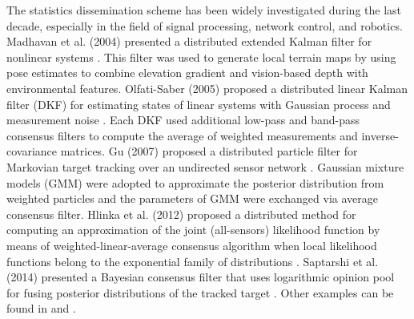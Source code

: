 	The statistics dissemination scheme has been widely investigated during the last decade, especially in the field of signal processing, network control, and robotics.
	Madhavan et al. (2004) presented a distributed extended Kalman filter for nonlinear systems \cite{madhavan2004distributed}. 
	This filter was used to generate local terrain maps by using pose estimates to combine elevation gradient and vision-based depth with environmental features. 
	Olfati-Saber (2005) proposed a distributed linear Kalman filter (DKF) for estimating states of linear systems with Gaussian process and measurement noise \cite{2005distributed}. 
	Each DKF used additional low-pass and band-pass consensus filters to compute the average of weighted measurements and inverse-covariance matrices. 
	Gu (2007) proposed a distributed particle filter for Markovian target tracking over an undirected sensor network \cite{gu2007distributed}. Gaussian mixture models (GMM) were adopted to approximate the posterior distribution from weighted particles and the parameters of GMM were exchanged via average consensus filter. 
	Hlinka et al. (2012) proposed a distributed method for computing an approximation of the joint (all-sensors) likelihood function by means of weighted-linear-average consensus algorithm when local likelihood functions belong to the exponential family of distributions \cite{hlinka2012likelihood}. Saptarshi et al. (2014) presented a Bayesian consensus filter that uses logarithmic opinion pool for fusing posterior distributions of the tracked target \cite{bandyopadhyay2014distributed}. Other examples can be found in \cite{julian2012distributed} and \cite{beaudeau2012target}. 
	
